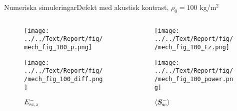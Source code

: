 \documentclass[11pt]{beamer}
\begin{document}
	\begin{frame}{Numeriska simuleringar}{Defekt med akustisk kontrast, $\rho_0 = 100$ kg/m$^2$}
		\begin{columns}
			\begin{column}{0.5\textwidth}
				\begin{figure}
					\centering
					\begin{overprint}
						\texttt{[image: ../../Text/Report/fig/mech\_fig\_100\_p.png]}
						\caption*{$p$}
						
						\texttt{[image: ../../Text/Report/fig//mech\_fig\_100\_diff.png]}
						\caption*{$E_{\mathrm{sc}, z}^-$}
					\end{overprint}
				\end{figure}
			\end{column}
			\begin{column}{0.5\textwidth}
				\begin{figure}
					\centering
					\begin{overprint}
						\onslide<1>
						\texttt{[image: ../../Text/Report/fig//mech\_fig\_100\_Ez.png]}
						\caption*{$E_{\mrm{i}, z}$}
						
						\onslide<2>
						\texttt{[image: ../../Text/Report/fig//mech\_fig\_100\_power.png]}
						\caption*{$\left< \bm{S}_{\mathrm{sc}}^- \right>$}
					\end{overprint}
				\end{figure}
			\end{column}
		\end{columns}
	\end{frame}
	
\end{document}
